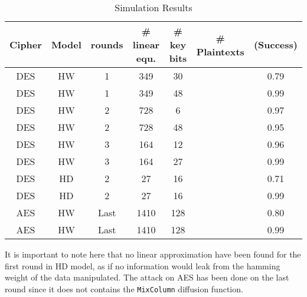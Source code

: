 \documentclass[11pt,a4paper]{article}
\begin{document}
{{{{{{{{{{\begin{table}[!h]
\begin{center}
\tiny{
\begin{tabular}{|c|c|c|c|c|c|c|}
\hline
Cipher & Model & rounds & \# linear equ. & \# key bits & \# Plaintexts & (Success) \\
\hline
\hline
DES    & HW    & 1      &  349           &  30         &    & 0.79           \\
DES    & HW    & 1      &  349           &  48         &    & 0.99           \\
\hline
DES    & HW    & 2      &  728           &   6         &     & 0.97           \\
DES    & HW    & 2      &  728           &   48        &    & 0.95           \\
\hline
DES    & HW    & 3      &  164           &   12        &    & 0.96           \\
DES    & HW    & 3      &  164           &   27        &    & 0.99           \\
\hline
DES    & HD    & 2      &  27            &  16         &    & 0.71           \\
DES    & HD    & 2      &  27            &  16         &    & 0.99           \\
\hline
AES    & HW    & Last   &  1410          &  128        &    & 0.80           \\
AES    & HW    & Last   &  1410          &  128        &    & 0.99           \\
\hline
\end{tabular}
\caption{Simulation Results}
\label{table:result_MLPA_simu}
}
\end{center}
\end{table}
It is important to note here that no linear approximation have been found for the first round in HD model, as if no information would leak from the hamming weight of the 
data manipulated. The attack on AES has been done on the last round since it does not contains the \texttt{MixColumn} diffusion function.
\vspace{1ex} \\
}}}}}}}}}}
\end{document}
